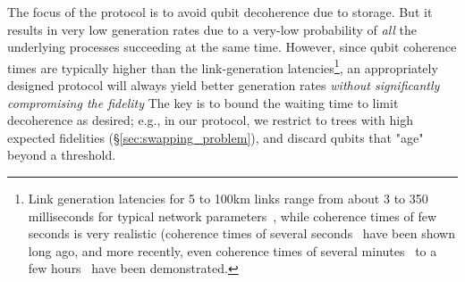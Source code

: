 The focus of the \os protocol is to avoid qubit decoherence  
due to storage. But it results in very low generation rates
due to a very-low probability of \textit{all} the underlying 
processes succeeding at the same time. 
However, since qubit coherence times are 
typically higher than the link-generation latencies\footnote{Link generation latencies 
for 5 to 100km links range from about 3 to 350 milliseconds
for typical network parameters~\cite{caleffi}, while coherence times of few
seconds is very realistic (coherence times of several seconds~\cite{Longdell-2005,Fraval-2005} have been shown 
long ago, and more recently, 
even coherence times of several minutes~\cite{dec-13,dec-14} to a few hours~\cite{dec-15,dec-2021} 
have been demonstrated.},
an appropriately designed \wt protocol will always 
yield better generation rates \textit{without significantly compromising the fidelity} %
The key is to bound the waiting time to limit decoherence
as desired; e.g., in our protocol, we restrict to trees with high expected 
fidelities (\S\ref{sec:swapping_problem}), and discard qubits that
"age" beyond a threshold.




